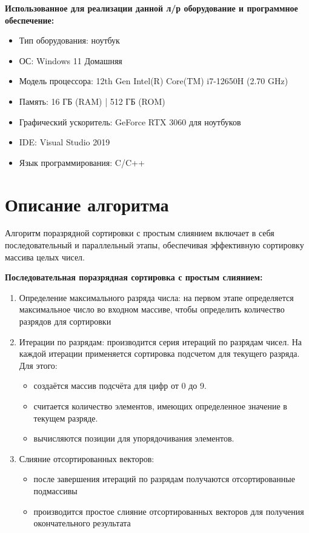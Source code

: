 \documentclass[a4paper, 14pt]{article}
\begin{document}
	\textbf{Использованное для реализации данной л/р оборудование и программное обеспечение:} 
	\vspace{-1em}
	\begin{itemize}[leftmargin=3em]
		\setlength\itemsep{0cm}
		\item Тип оборудования: ноутбук
		\item ОС: Windows 11 Домашняя
		\item Модель процессора: 12th Gen Intel(R) Core(TM) i7-12650H (2.70 GHz)
		\item Память: 16 ГБ (RAM) | 512 ГБ (ROM)
		\item Графический ускоритель: GeForce RTX 3060 для ноутбуков
		\item IDE: Visual Studio 2019
		\item Язык программирования: C/C++
	\end{itemize}
	
	
	\newpage
	\section*{\centering Описание алгоритма}
	Алгоритм поразрядной сортировки с простым слиянием включает в себя последовательный и параллельный этапы, обеспечивая эффективную сортировку массива целых чисел.
	
	\textbf{Последовательная поразрядная сортировка с простым слиянием:}
	\vspace{-2.5em}
	\begin{enumerate}[leftmargin=3em]
		\setlength\itemsep{0cm}
		\item Определение максимального разряда числа: на первом этапе определяется максимальное число во входном массиве, чтобы определить количество разрядов для сортировки
		\item Итерации по разрядам: производится серия итераций по разрядам чисел. На каждой итерации применяется сортировка подсчетом для текущего разряда. Для этого: \vspace{-0.3cm}
		\begin{itemize}
			\setlength\itemsep{0cm}
			\item создаётся массив подсчёта для цифр от 0 до 9.
			\item считается количество элементов, имеющих определенное значение в текущем разряде.
			\item вычисляются позиции для упорядочивания элементов.
		\end{itemize}
		\item Слияние отсортированных векторов: 
		\vspace{-0.3cm}
		\begin{itemize}
			\setlength\itemsep{0cm}
			\item после завершения итераций по разрядам получаются отсортированные подмассивы
			\item производится простое слияние отсортированных векторов для получения окончательного результата
		\end{itemize}
	\end{enumerate}
	
\end{document}
